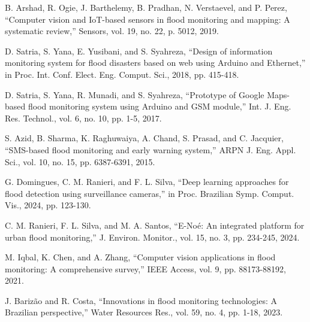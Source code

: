 \documentclass[conference]{IEEEtran}
\begin{document}
\begin{thebibliography}{00}
 B. Arshad, R. Ogie, J. Barthelemy, B. Pradhan, N. Verstaevel, and P. Perez, ``Computer vision and IoT-based sensors in flood monitoring and mapping: A systematic review,'' Sensors, vol. 19, no. 22, p. 5012, 2019.

 D. Satria, S. Yana, E. Yusibani, and S. Syahreza, ``Design of information monitoring system for flood disasters based on web using Arduino and Ethernet,'' in Proc. Int. Conf. Elect. Eng. Comput. Sci., 2018, pp. 415-418.

 D. Satria, S. Yana, R. Munadi, and S. Syahreza, ``Prototype of Google Maps-based flood monitoring system using Arduino and GSM module,'' Int. J. Eng. Res. Technol., vol. 6, no. 10, pp. 1-5, 2017.

 S. Azid, B. Sharma, K. Raghuwaiya, A. Chand, S. Prasad, and C. Jacquier, ``SMS-based flood monitoring and early warning system,'' ARPN J. Eng. Appl. Sci., vol. 10, no. 15, pp. 6387-6391, 2015.

 G. Domingues, C. M. Ranieri, and F. L. Silva, ``Deep learning approaches for flood detection using surveillance cameras,'' in Proc. Brazilian Symp. Comput. Vis., 2024, pp. 123-130.

 C. M. Ranieri, F. L. Silva, and M. A. Santos, ``E-Noé: An integrated platform for urban flood monitoring,'' J. Environ. Monitor., vol. 15, no. 3, pp. 234-245, 2024.

 M. Iqbal, K. Chen, and A. Zhang, ``Computer vision applications in flood monitoring: A comprehensive survey,'' IEEE Access, vol. 9, pp. 88173-88192, 2021.

 J. Barizão and R. Costa, ``Innovations in flood monitoring technologies: A Brazilian perspective,'' Water Resources Res., vol. 59, no. 4, pp. 1-18, 2023.
\end{thebibliography}
\end{document}
